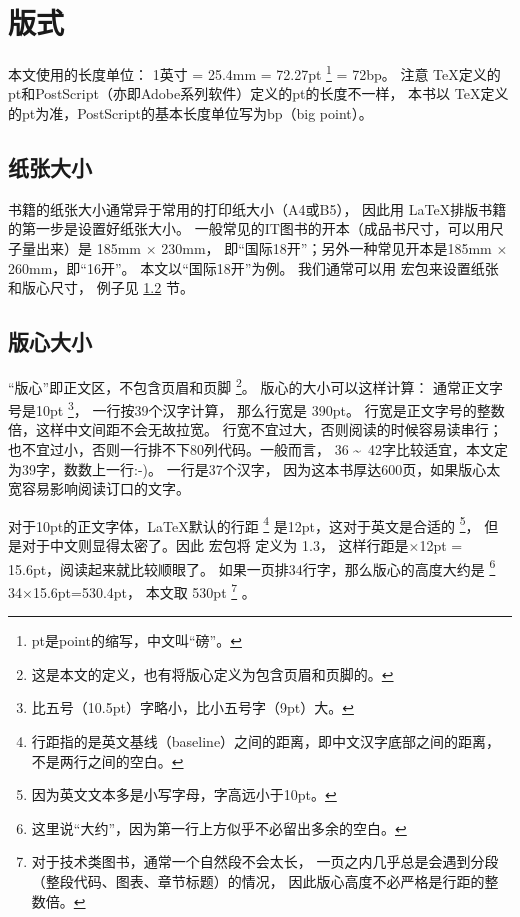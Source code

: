 \chapter{版式}

本文使用的长度单位：
1英寸 = 25.4mm = 72.27pt \footnote{pt是point的缩写，中文叫“磅”。} = 72bp。
注意 \TeX 定义的pt和PostScript（亦即Adobe系列软件）定义的pt的长度不一样，
本书以 \TeX 定义的pt为准，Post\-Script的基本长度单位写为bp（big point）。

\section{纸张大小} %

书籍的纸张大小通常异于常用的打印纸大小（A4或B5），
因此用 \LaTeX 排版书籍的第一步是设置好纸张大小。
一般常见的IT图书的开本（成品书尺寸，可以用尺子量出来）是 185mm $\times$ 230mm，
即“国际18开”；另外一种常见开本是185mm $\times$ 260mm，即“16开”。
本文以“国际18开”为例。
我们通常可以用  宏包来设置纸张和版心尺寸，
例子见 \ref{sec:textbody} 节。

\section{版心大小} %
\label{sec:textbody}

“版心”即正文区，不包含页眉和页脚
\footnote{这是本文的定义，也有将版心定义为包含页眉和页脚的。}。
版心的大小可以这样计算：
通常正文字号是10pt
\footnote{比五号（10.5pt）字略小，比小五号字（9pt）大。}，
一行按39个汉字计算，
那么行宽是 390pt。
行宽是正文字号的整数倍，这样中文间距不会无故拉宽。
行宽不宜过大，否则阅读的时候容易读串行；
也不宜过小，否则一行排不下80列代码。一般而言，
36 \textasciitilde\ 42字比较适宜，本文定为39字，数数上一行:-)。
\mybooktitle 一行是37个汉字，
因为这本书厚达600页，如果版心太宽容易影响阅读订口的文字。

对于10pt的正文字体，\LaTeX 默认的行距
\footnote{行距指的是英文基线（baseline）之间的距离，即中文汉字底部之间的距离，
不是两行之间的空白。} 是12pt，这对于英文是合适的
\footnote{因为英文文本多是小写字母，字高远小于10pt。}，
但是对于中文则显得太密了。因此 \CTeX 宏包将  定义为 1.3，
这样行距是$\times$12pt = 15.6pt，阅读起来就比较顺眼了。
如果一页排34行字，那么版心的高度大约是 \nolinebreak
\footnote{这里说“大约”，因为第一行上方似乎不必留出多余的空白。} 34$\times$15.6pt=530.4pt，
本文取 530pt
\footnote{对于技术类图书，通常一个自然段不会太长，
一页之内几乎总是会遇到分段（整段代码、图表、章节标题）的情况，
因此版心高度不必严格是行距的整数倍。} 。

